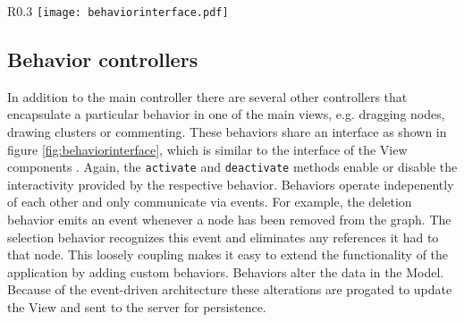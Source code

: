 \begin{wrapfigure}{R}{0.3\textwidth}
\texttt{[image: behaviorinterface.pdf]}
\caption{Class diagram of the Behavior interface}
\label{fig:behaviorinterface}
\end{wrapfigure}

\subsection{Behavior controllers}
\label{sec:behavior}

In addition to the main controller there are several other controllers that encapsulate a particular behavior in one of the main views, e.g. dragging nodes, drawing clusters or commenting. These behaviors share an interface as shown in figure \ref{fig:behaviorinterface}, which is similar to the interface of the View components . Again, the \texttt{activate} and \texttt{deactivate} methods enable or disable the interactivity provided by the respective behavior. Behaviors operate indepenently of each other and only communicate via events. For example, the deletion behavior emits an event whenever a node has been removed from the graph. The selection behavior recognizes this event and eliminates any references it had to that node. This loosely coupling makes it easy to extend the functionality of the application by adding custom behaviors. Behaviors alter the data in the Model. Because of the event-driven architecture these alterations are progated to update the View and sent to the server for persistence.

